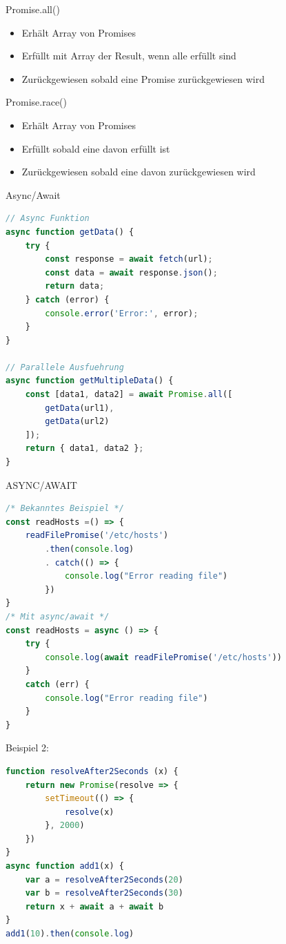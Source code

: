 \begin{definition}{Promise.all()}
\begin{itemize}
  \item Erhält Array von Promises
  \item Erfüllt mit Array der Result, wenn alle erfüllt sind
  \item Zurückgewiesen sobald eine Promise zurückgewiesen wird
\end{itemize}
\end{definition}

\begin{definition}{Promise.race()}
\begin{itemize}
  \item Erhält Array von Promises
  \item Erfüllt sobald eine davon erfüllt ist
  \item Zurückgewiesen sobald eine davon zurückgewiesen wird
\end{itemize}
\end{definition}

\begin{KR}{Async/Await}
\begin{lstlisting}[language=JavaScript, style=basesmol]
// Async Funktion
async function getData() {
    try {
        const response = await fetch(url);
        const data = await response.json();
        return data;
    } catch (error) {
        console.error('Error:', error);
    }
}

// Parallele Ausfuehrung
async function getMultipleData() {
    const [data1, data2] = await Promise.all([
        getData(url1),
        getData(url2)
    ]);
    return { data1, data2 };
}
\end{lstlisting}
\end{KR}

\begin{code}{ASYNC/AWAIT}
\begin{lstlisting}[language=JavaScript, style=basesmol]
/* Bekanntes Beispiel */
const readHosts =() => {
    readFilePromise('/etc/hosts')
        .then(console.log)
        . catch(() => {
            console.log("Error reading file")
        })
}
/* Mit async/await */
const readHosts = async () => {
    try {
        console.log(await readFilePromise('/etc/hosts'))
    }
    catch (err) {
        console.log("Error reading file")
    }
}
\end{lstlisting}
Beispiel 2:
\begin{lstlisting}[language=JavaScript, style=basesmol]
function resolveAfter2Seconds (x) {
    return new Promise(resolve => {
        setTimeout(() => {
            resolve(x)
        }, 2000)
    })
}
async function add1(x) {
    var a = resolveAfter2Seconds(20)
    var b = resolveAfter2Seconds(30)
    return x + await a + await b
}
add1(10).then(console.log)
\end{lstlisting}
\end{code}



